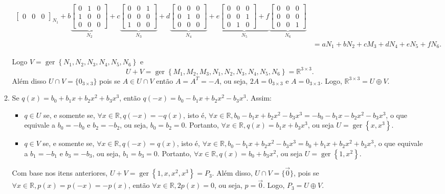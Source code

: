 \documentclass[12pt,a4paper]{article}
\newcommand*\ger[1]{\operatorname{ger}\left\{#1\right\}}
\newcommand*\R{\mathbb{R}}
\begin{document}
\begin{enumerate}
\begin{enumerate}
\begin{footnotesize}
\begin{align*}
{\begin{bmatrix}
0 & 0 & 0
\end{bmatrix}
}_{N_1}
+b
\underbrace{
\begin{bmatrix}
0 & 1 & 0\\
1 & 0 & 0\\
0 & 0 & 0
\end{bmatrix}
}_{N_2}
+c
\underbrace{
\begin{bmatrix}
0 & 0 & 1\\
0 & 0 & 0\\
1 & 0 & 0
\end{bmatrix}
}_{N_3}
+d
\underbrace{
\begin{bmatrix}
0 & 0 & 0\\
0 & 1 & 0\\
0 & 0 & 0
\end{bmatrix}
}_{N_4}
+e
\underbrace{
\begin{bmatrix}
0 & 0 & 0\\
0 & 0 & 1\\
0 & 1 & 0
\end{bmatrix}
+f
}_{N_5}
\underbrace{
\begin{bmatrix}
0 & 0 & 0\\
0 & 0 & 0\\
0 & 0 & 1
\end{bmatrix}
}_{N_6}\\
&=aN_1 + bN_2+cM_3+dN_4+eN_5+fN_6.
\end{align*}
\end{footnotesize}

Logo $V = \ger{N_1, N_2, N_3, N_4, N_5, N_6}$ e
\[
U+V= \ger{M_1, M_2, M_3, N_1, N_2, N_3, N_4, N_5, N_6}
= \R^{3 \times 3}.
\]
Além disso $U \cap V = \{ 0_{3 \times 3} \}$ pois se $A \in U \cap V$ então $A = A^T = -A$, ou seja, $2A = 0_{3\times3}$ e $A=0_{3\times3}$. Logo, $\R^{3 \times 3} = U \oplus V$.

\item Se $q(x)=b_0 + b_1x+b_2x^2+b_3x^3$, então $q(-x)=b_0 - b_1x + b_2x^2 - b_3x^3$. Assim:
\begin{itemize}
\item $q \in U$ se, e somente se, $\forall x \in \R, q(-x) = -q(x)$, isto é, $\forall x \in \R, b_0 - b_1x + b_2x^2 - b_3x^3 = -b_0 - b_1x - b_2x^2 - b_3x^3$, o que equivale a $b_0 = -b_0$ e $b_2 = -b_2$, ou seja, $b_0 = b_2 = 0$. Portanto, $\forall x \in \R, q(x) = b_1 x + b_3 x^3$, ou seja $U = \ger{x, x^3}$.
\item $q \in V$ se, e somente se, $\forall x \in \R, q(-x) = q(x)$, isto é, $\forall x \in \R, b_0 - b_1x + b_2x^2 - b_3x^3 = b_0 + b_1x + b_2x^2 + b_3x^3$, o que equivale a $b_1 = -b_1$ e $b_3 = -b_3$, ou seja, $b_1 = b_3 = 0$. Portanto, $\forall x \in \R, q(x) = b_0 + b_3 x^2$, ou seja $U = \ger{1, x^2}$.
\end{itemize}
Com base nos itens anteriores, $U + V = \ger{1,x,x^2,x^3} = P_3$. Além disso, $U \cap V = \{ \vec{0} \}$, pois se $\forall x \in \R, p(x) = p(-x) = -p(x)$, então $\forall x \in \R, 2p(x)=0$, ou seja, $p = \vec{0}$. Logo, $P_3 = U \oplus V$.


\end{enumerate}
\end{enumerate}
\end{document}

